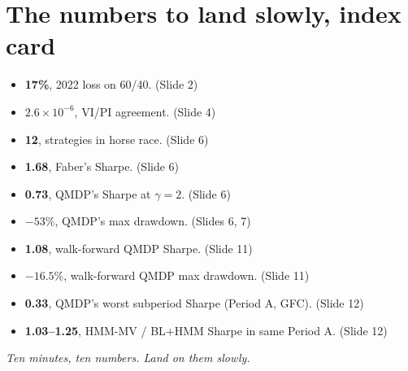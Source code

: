 \documentclass[11pt]{article}
\begin{document}
\section*{The numbers to land slowly, index card}

\begin{itemize}
  \item \textbf{17\%}, 2022 loss on 60/40. (Slide 2)
  \item \textbf{$2.6\times 10^{-6}$}, VI/PI agreement. (Slide 4)
  \item \textbf{12}, strategies in horse race. (Slide 6)
  \item \textbf{1.68}, Faber's Sharpe. (Slide 6)
  \item \textbf{0.73}, QMDP's Sharpe at $\gamma = 2$. (Slide 6)
  \item \textbf{$-53\%$}, QMDP's max drawdown. (Slides 6, 7)
  \item \textbf{1.08}, walk-forward QMDP Sharpe. (Slide 11)
  \item \textbf{$-16.5\%$}, walk-forward QMDP max drawdown. (Slide 11)
  \item \textbf{0.33}, QMDP's worst subperiod Sharpe (Period A, GFC). (Slide 12)
  \item \textbf{1.03--1.25}, HMM-MV / BL+HMM Sharpe in same Period A. (Slide 12)
\end{itemize}

\bigskip
\begin{center}
\textit{Ten minutes, ten numbers. Land on them slowly.}
\end{center}
\end{document}
